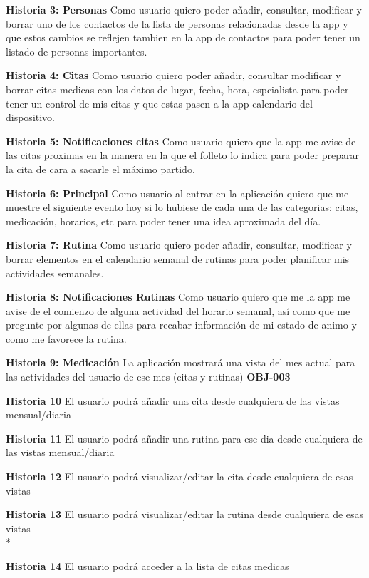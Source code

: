 \documentclass[../pfc.tex]{subfiles}
\begin{document}
	\textbf{Historia 3: Personas}	
		Como usuario quiero poder añadir, consultar, modificar y borrar uno de los contactos de la lista de personas relacionadas desde la app y que estos cambios se reflejen tambien en la app de contactos para poder tener un listado de personas importantes.
	
	\textbf{Historia 4: Citas}	
		Como usuario quiero poder añadir, consultar modificar y borrar citas medicas con los datos de lugar, fecha, hora, espcialista para poder tener un control de mis citas y que estas pasen a la app calendario del dispositivo. 
		
	\textbf{Historia 5: Notificaciones citas}	
		Como usuario quiero que la app me avise de las citas proximas en la manera en la que el folleto lo indica para poder preparar la cita de cara a sacarle el máximo partido.
	
	\textbf{Historia 6: Principal}
		Como usuario al entrar en la aplicación quiero que me muestre el siguiente evento hoy si lo hubiese de cada una de las categorias: citas, medicación, horarios, etc para poder tener una idea aproximada del día.
	
	\textbf{Historia 7: Rutina}
		Como usuario quiero poder añadir, consultar, modificar y borrar elementos en el calendario semanal de rutinas para poder planificar mis actividades semanales.
	
	\textbf{Historia 8: Notificaciones Rutinas}
		Como usuario quiero que me la app me avise de el comienzo de alguna actividad del horario semanal, así como que me pregunte por algunas de ellas para recabar información de mi estado de animo y como me favorece la rutina. 
	
	\textbf{Historia 9: Medicación}	La aplicación mostrará una vista del mes actual para las actividades del usuario de ese mes (citas y rutinas)	\textbf{OBJ-003}
	
	\textbf{Historia 10}	El usuario podrá añadir una cita desde cualquiera de las vistas mensual/diaria
	
	\textbf{Historia 11}	El usuario podrá añadir una rutina para ese dia desde cualquiera de las vistas mensual/diaria
	
	\textbf{Historia 12}	El usuario podrá visualizar/editar la cita desde cualquiera de esas vistas
	
	\textbf{Historia 13}	El usuario podrá visualizar/editar la rutina desde cualquiera de esas vistas\\*
	
	\textbf{Historia 14}	El usuario podrá acceder a la lista de citas medicas
	
\end{document}
